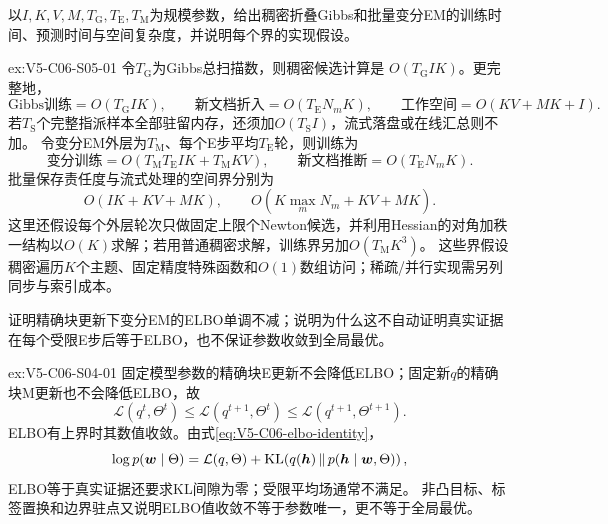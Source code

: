 \begin{SLChapterExercisePairSection}
\begin{exercise}\label{ex:V5-C06-S05-01}
以$I,K,V,M,T_{\mathrm G},T_{\mathrm E},T_{\mathrm M}$为规模参数，给出稠密折叠Gibbs和批量变分EM的训练时间、预测时间与空间复杂度，并说明每个界的实现假设。
\end{exercise}
\ifSLFullEdition
{}\label{sol:V5-C06-S05-01}
\begin{chapterexercisesolution}{ex:V5-C06-S05-01}
\nopagebreak[4]
令$T_{\mathrm G}$为Gibbs总扫描数，则稠密候选计算是
$O(T_{\mathrm G}IK)$。更完整地，
\[
\text{Gibbs训练}=O(T_{\mathrm G}IK),\qquad
\text{新文档折入}=O(T_{\mathrm E}N_mK),\qquad
\text{工作空间}=O(KV+MK+I).
\]
若$T_{\mathrm S}$个完整指派样本全部驻留内存，还须加$O(T_{\mathrm S}I)$，流式落盘或在线汇总则不加。
令变分EM外层为$T_{\mathrm M}$、每个E步平均$T_{\mathrm E}$轮，则训练为
\[
\text{变分训练}
=O(T_{\mathrm M}T_{\mathrm E}IK+T_{\mathrm M}KV),\qquad
\text{新文档推断}=O(T_{\mathrm E}N_mK).
\]
批量保存责任度与流式处理的空间界分别为
\[
O(IK+KV+MK),\qquad
O(K\max_mN_m+KV+MK).
\]
这里还假设每个外层轮次只做固定上限个Newton候选，并利用Hessian的对角加秩一结构以$O(K)$求解；若用普通稠密求解，训练界另加$O(T_{\mathrm M}K^3)$。
这些界假设稠密遍历$K$个主题、固定精度特殊函数和$O(1)$数组访问；稀疏/并行实现需另列同步与索引成本。
\end{chapterexercisesolution}
\fi

\begin{exercise}\label{ex:V5-C06-S04-01}
证明精确块更新下变分EM的ELBO单调不减；说明为什么这不自动证明真实证据在每个受限E步后等于ELBO，也不保证参数收敛到全局最优。
\end{exercise}
\ifSLFullEdition
{}\label{sol:V5-C06-S04-01}
\begin{chapterexercisesolution}{ex:V5-C06-S04-01}
\nopagebreak[4]
固定模型参数的精确块E更新不会降低ELBO；固定新$q$的精确块M更新也不会降低ELBO，故
\[
\mathcal L(q^{t},\Theta^{t})
\le\mathcal L(q^{t+1},\Theta^{t})
\le\mathcal L(q^{t+1},\Theta^{t+1}).
\]
ELBO有上界时其数值收敛。由式\eqref{eq:V5-C06-elbo-identity}，
\[
\log p(\boldsymbol w\mid\Theta)
=\mathcal L(q,\Theta)
+\operatorname{KL}\!\left(q(\boldsymbol h)\,\middle\|\,p(\boldsymbol h\mid\boldsymbol w,\Theta)\right),
\]
ELBO等于真实证据还要求KL间隙为零；受限平均场通常不满足。
非凸目标、标签置换和边界驻点又说明ELBO值收敛不等于参数唯一，更不等于全局最优。
\end{chapterexercisesolution}
\fi


\end{SLChapterExercisePairSection}
